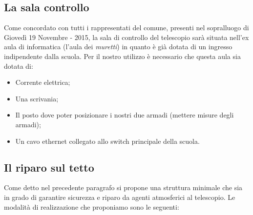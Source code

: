 \documentclass[a4paper,12pt]{article}
\begin{document}
\subsection{La sala controllo}
Come concordato con tutti i rappresentati del comune, presenti nel sopralluogo di Gioved\`i 19 Novembre - 2015, la sala di controllo del telescopio sar\`a situata nell'ex aula di informatica (l'aula dei \textit{muretti}) in quanto \`e gi\`a dotata di un ingresso indipendente dalla scuola. Per il nostro utilizzo \`e necessario che questa aula sia dotata di:
\begin{itemize}
	\item Corrente elettrica;
	\item Una scrivania;
	\item Il posto dove poter posizionare i nostri due armadi (mettere misure degli armadi);	\item Un cavo ethernet collegato allo switch principale della scuola.
\end{itemize}

\subsection{Il riparo sul tetto}
Come detto nel precedente paragrafo si propone una struttura minimale che sia in grado di garantire sicurezza e riparo da agenti atmosferici al telescopio. Le modalit\`a di realizzazione che proponiamo sono le seguenti:
\end{document}
